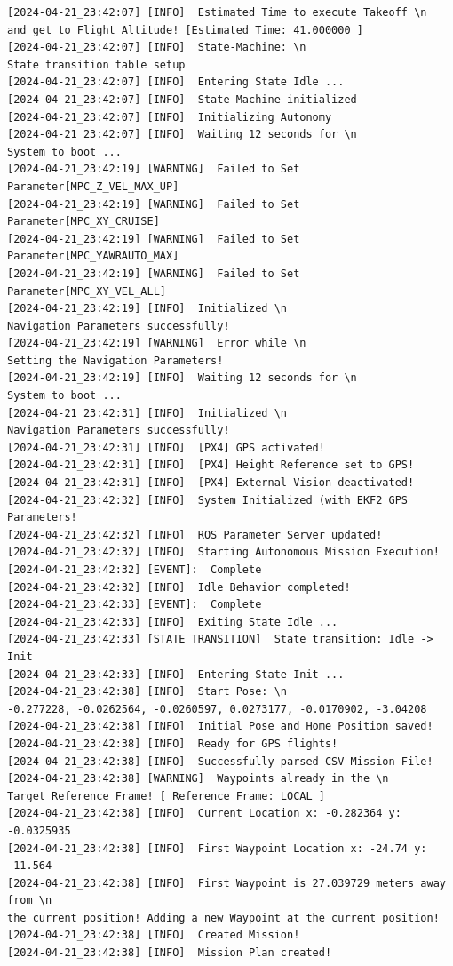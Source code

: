 \begin{lstlisting}
[2024-04-21_23:42:07] [INFO]  Estimated Time to execute Takeoff \n
and get to Flight Altitude! [Estimated Time: 41.000000 ]
[2024-04-21_23:42:07] [INFO]  State-Machine: \n
State transition table setup
[2024-04-21_23:42:07] [INFO]  Entering State Idle ...
[2024-04-21_23:42:07] [INFO]  State-Machine initialized
[2024-04-21_23:42:07] [INFO]  Initializing Autonomy
[2024-04-21_23:42:07] [INFO]  Waiting 12 seconds for \n 
System to boot ... 
[2024-04-21_23:42:19] [WARNING]  Failed to Set Parameter[MPC_Z_VEL_MAX_UP]
[2024-04-21_23:42:19] [WARNING]  Failed to Set Parameter[MPC_XY_CRUISE]
[2024-04-21_23:42:19] [WARNING]  Failed to Set Parameter[MPC_YAWRAUTO_MAX]
[2024-04-21_23:42:19] [WARNING]  Failed to Set Parameter[MPC_XY_VEL_ALL]
[2024-04-21_23:42:19] [INFO]  Initialized \n 
Navigation Parameters successfully!
[2024-04-21_23:42:19] [WARNING]  Error while \n 
Setting the Navigation Parameters!
[2024-04-21_23:42:19] [INFO]  Waiting 12 seconds for \n 
System to boot ... 
[2024-04-21_23:42:31] [INFO]  Initialized \n 
Navigation Parameters successfully!
[2024-04-21_23:42:31] [INFO]  [PX4] GPS activated!
[2024-04-21_23:42:31] [INFO]  [PX4] Height Reference set to GPS!
[2024-04-21_23:42:31] [INFO]  [PX4] External Vision deactivated!
[2024-04-21_23:42:32] [INFO]  System Initialized (with EKF2 GPS Parameters!
[2024-04-21_23:42:32] [INFO]  ROS Parameter Server updated!
[2024-04-21_23:42:32] [INFO]  Starting Autonomous Mission Execution!
[2024-04-21_23:42:32] [EVENT]:  Complete
[2024-04-21_23:42:32] [INFO]  Idle Behavior completed!
[2024-04-21_23:42:33] [EVENT]:  Complete
[2024-04-21_23:42:33] [INFO]  Exiting State Idle ...
[2024-04-21_23:42:33] [STATE TRANSITION]  State transition: Idle -> Init
[2024-04-21_23:42:33] [INFO]  Entering State Init ...
[2024-04-21_23:42:38] [INFO]  Start Pose: \n 
-0.277228, -0.0262564, -0.0260597, 0.0273177, -0.0170902, -3.04208
[2024-04-21_23:42:38] [INFO]  Initial Pose and Home Position saved!
[2024-04-21_23:42:38] [INFO]  Ready for GPS flights!
[2024-04-21_23:42:38] [INFO]  Successfully parsed CSV Mission File!
[2024-04-21_23:42:38] [WARNING]  Waypoints already in the \n 
Target Reference Frame! [ Reference Frame: LOCAL ]
[2024-04-21_23:42:38] [INFO]  Current Location x: -0.282364 y: -0.0325935
[2024-04-21_23:42:38] [INFO]  First Waypoint Location x: -24.74 y: -11.564
[2024-04-21_23:42:38] [INFO]  First Waypoint is 27.039729 meters away from \n 
the current position! Adding a new Waypoint at the current position!
[2024-04-21_23:42:38] [INFO]  Created Mission!
[2024-04-21_23:42:38] [INFO]  Mission Plan created!

\end{lstlisting}
